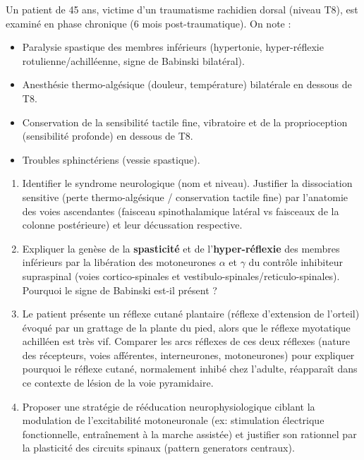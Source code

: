\documentclass[11pt]{article}
\begin{document}
\begin{exercice}
Un patient de 45 ans, victime d'un traumatisme rachidien dorsal (niveau T8), est examiné en phase chronique (6 mois post-traumatique). On note : 
\begin{itemize}
    \item Paralysie spastique des membres inférieurs (hypertonie, hyper-réflexie rotulienne/achilléenne, signe de Babinski bilatéral).
    \item Anesthésie thermo-algésique (douleur, température) bilatérale en dessous de T8.
    \item Conservation de la sensibilité tactile fine, vibratoire et de la proprioception (sensibilité profonde) en dessous de T8.
    \item Troubles sphinctériens (vessie spastique).
\end{itemize}
\begin{enumerate}
    \item Identifier le syndrome neurologique (nom et niveau). Justifier la dissociation sensitive (perte thermo-algésique / conservation tactile fine) par l'anatomie des voies ascendantes (faisceau spinothalamique latéral vs faisceaux de la colonne postérieure) et leur décussation respective.
    \item Expliquer la genèse de la \textbf{spasticité} et de l'\textbf{hyper-réflexie} des membres inférieurs par la libération des motoneurones $\alpha$ et $\gamma$ du contrôle inhibiteur supraspinal (voies cortico-spinales et vestibulo-spinales/reticulo-spinales). Pourquoi le signe de Babinski est-il présent ?
    \item Le patient présente un réflexe cutané plantaire (réflexe d'extension de l'orteil) évoqué par un grattage de la plante du pied, alors que le réflexe myotatique achilléen est très vif. Comparer les arcs réflexes de ces deux réflexes (nature des récepteurs, voies afférentes, interneurones, motoneurones) pour expliquer pourquoi le réflexe cutané, normalement inhibé chez l'adulte, réapparaît dans ce contexte de lésion de la voie pyramidaire.
    \item Proposer une stratégie de rééducation neurophysiologique ciblant la modulation de l'excitabilité motoneuronale (ex: stimulation électrique fonctionnelle, entraînement à la marche assistée) et justifier son rationnel par la plasticité des circuits spinaux (pattern generators centraux).
\end{enumerate}
\end{exercice}
\end{document}
